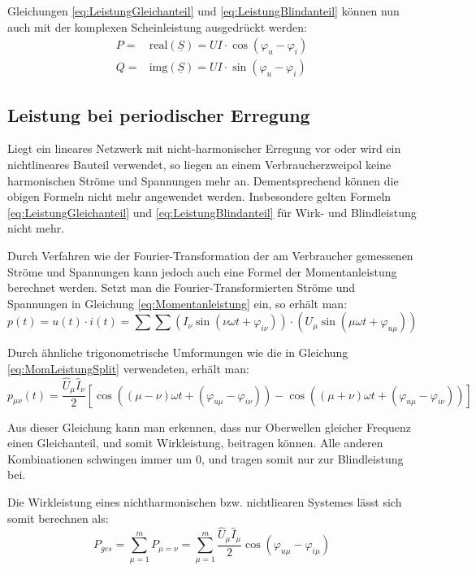 Gleichungen \eqref{eq:LeistungGleichanteil} und \eqref{eq:LeistungBlindanteil} können nun auch mit der komplexen Scheinleistung ausgedrückt werden:
\begin{eqnarray}
P=& \mbox{real}(\underline{S}) = UI\cdot \cos(\varphi_u-\varphi_i)\label{eq:KomplexP}\\
Q=& \mbox{img}(\underline{S}) = UI\cdot \sin(\varphi_u-\varphi_i) \label{eq:KomplexQ}
\end{eqnarray}

\subsection{Leistung bei periodischer Erregung}
Liegt ein lineares Netzwerk mit nicht-harmonischer Erregung vor oder wird ein nichtlineares Bauteil verwendet, so liegen an einem Verbraucherzweipol keine harmonischen Ströme und Spannungen mehr an. Dementsprechend können die obigen Formeln nicht mehr angewendet werden. Insbesondere gelten Formeln \eqref{eq:LeistungGleichanteil} und \eqref{eq:LeistungBlindanteil} für Wirk- und Blindleistung nicht mehr.

Durch Verfahren wie der Fourier-Transformation der am Verbraucher gemessenen Ströme und Spannungen kann jedoch auch eine Formel der Momentanleistung berechnet werden. Setzt man die Fourier-Transformierten Ströme und Spannungen in Gleichung \eqref{eq:Momentanleistung} ein, so erhält man:
\begin{equation*}
p(t)=u(t)\cdot i(t) = \sum\sum\left(I_\nu\sin(\nu \omega t+ \varphi_{i\nu})\right) \cdot \left(U_\mu\sin(\mu \omega t + \varphi_{u\mu})\right)
\end{equation*}

Durch ähnliche trigonometrische Umformungen wie die in Gleichung \eqref{eq:MomLeistungSplit} verwendeten, erhält man:
\begin{equation}
p_{\mu\nu}(t)=\frac{\hat{U}_\mu\hat{I}_\nu}{2}\left[\cos((\mu-\nu)\omega t + (\varphi_{u\mu}-\varphi_{i\nu}))-\cos((\mu+\nu)\omega t + (\varphi_{u\mu}-\varphi_{i\nu}))\right]
\end{equation}

Aus dieser Gleichung kann man erkennen, dass nur Oberwellen gleicher Frequenz einen Gleichanteil, und somit Wirkleistung, beitragen können. Alle anderen Kombinationen schwingen immer um 0, und tragen somit nur zur Blindleistung bei.

Die Wirkleistung eines nichtharmonischen bzw. nichtliearen Systemes lässt sich somit berechnen als:
\begin{equation}
P_{ges}=\sum_{\mu = 1}^mP_{\mu=\nu}=\sum_{\mu = 1}^m\frac{\hat{U}_\mu\hat{I}_\mu}{2}\cos(\varphi_{u\mu}-\varphi_{i\mu}) \label{eq:WirkleistungFourier}
\end{equation}

